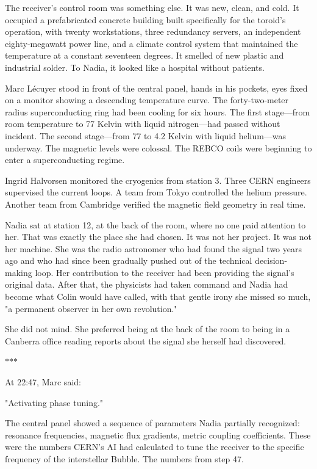 \documentclass[11pt,a5paper,twoside]{book}
\begin{document}
The receiver's control room was something else. It was new, clean, and cold. It occupied a prefabricated concrete building built specifically for the toroid's operation, with twenty workstations, three redundancy servers, an independent eighty-megawatt power line, and a climate control system that maintained the temperature at a constant seventeen degrees. It smelled of new plastic and industrial solder. To Nadia, it looked like a hospital without patients.

Marc Lécuyer stood in front of the central panel, hands in his pockets, eyes fixed on a monitor showing a descending temperature curve. The forty-two-meter radius superconducting ring had been cooling for six hours. The first stage—from room temperature to 77 Kelvin with liquid nitrogen—had passed without incident. The second stage—from 77 to 4.2 Kelvin with liquid helium—was underway. The magnetic levels were colossal. The REBCO coils were beginning to enter a superconducting regime.

Ingrid Halvorsen monitored the cryogenics from station 3. Three CERN engineers supervised the current loops. A team from Tokyo controlled the helium pressure. Another team from Cambridge verified the magnetic field geometry in real time.

Nadia sat at station 12, at the back of the room, where no one paid attention to her. That was exactly the place she had chosen. It was not her project. It was not her machine. She was the radio astronomer who had found the signal two years ago and who had since been gradually pushed out of the technical decision-making loop. Her contribution to the receiver had been providing the signal's original data. After that, the physicists had taken command and Nadia had become what Colin would have called, with that gentle irony she missed so much, "a permanent observer in her own revolution."

She did not mind. She preferred being at the back of the room to being in a Canberra office reading reports about the signal she herself had discovered.

\vspace{1.5em}
\begin{center}$\ast$\quad$\ast$\quad$\ast$\end{center}
\vspace{1.5em}

At 22:47, Marc said:

"Activating phase tuning."

The central panel showed a sequence of parameters Nadia partially recognized: resonance frequencies, magnetic flux gradients, metric coupling coefficients. These were the numbers CERN's AI had calculated to tune the receiver to the specific frequency of the interstellar Bubble. The numbers from step 47.
\end{document}

